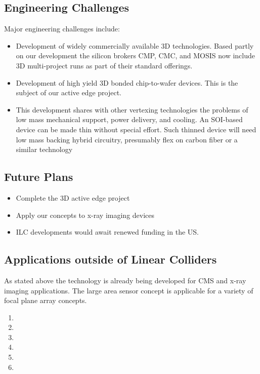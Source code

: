 \subsection{Engineering Challenges}
Major  engineering challenges include:
\begin{itemize}
\item Development of widely commercially available 3D technologies.  Based partly on our development the silicon brokers CMP, CMC, and MOSIS now include 3D multi-project runs as part of their standard offerings.
\item Development of high yield 3D bonded chip-to-wafer devices.  This is the subject of our active edge project.
\item This development shares with other vertexing technologies the problems of low mass mechanical support, power delivery, and cooling. An SOI-based device can be made thin without special effort. Such thinned device will need low mass backing hybrid circuitry, presumably flex on carbon fiber or a similar technology
\end{itemize}

\subsection{Future Plans}
\begin{itemize}
\item Complete the 3D active edge project
\item Apply our concepts to x-ray imaging devices
\item ILC developments would await renewed funding in the US.
\end{itemize}

\subsection{Applications outside of Linear Colliders}
As stated above the technology is already being developed for CMS and x-ray imaging applications.  The large area sensor concept is applicable for a variety of focal plane array concepts.

\begin{enumerate}
\item {}
\item {}
\item {}
\item {}
\item {}
\item {}
\end{enumerate}
